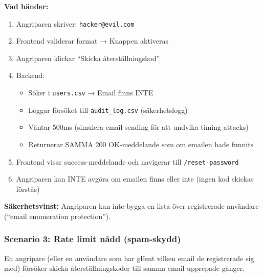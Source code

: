 \documentclass[12pt,a4paper]{article}
\begin{document}
\textbf{Vad händer:}
\begin{enumerate}[noitemsep]
  \item Angriparen skriver: \texttt{hacker@evil.com}
  \item Frontend validerar format → Knappen aktiveras
  \item Angriparen klickar ``Skicka återställningskod''
  \item Backend:
  \begin{itemize}[noitemsep]
    \item Söker i \texttt{users.csv} → Email finns INTE
    \item Loggar försöket till \texttt{audit\_log.csv} (säkerhetslogg)
    \item Väntar 500ms (simulera email-sending för att undvika timing attacks)
    \item Returnerar SAMMA 200 OK-meddelande som om emailen hade funnits
  \end{itemize}
  \item Frontend visar success-meddelande och navigerar till \texttt{/reset-password}
  \item Angriparen kan INTE avgöra om emailen finns eller inte (ingen kod skickas förstås)
\end{enumerate}

\textbf{Säkerhetsvinst:} Angriparen kan inte bygga en lista över registrerade användare (``email enumeration protection'').

\subsubsection{Scenario 3: Rate limit nådd (spam-skydd)}

En angripare (eller en användare som har glömt vilken email de registrerade sig med) försöker skicka återställningskoder till samma email upprepade gånger.
\end{document}
